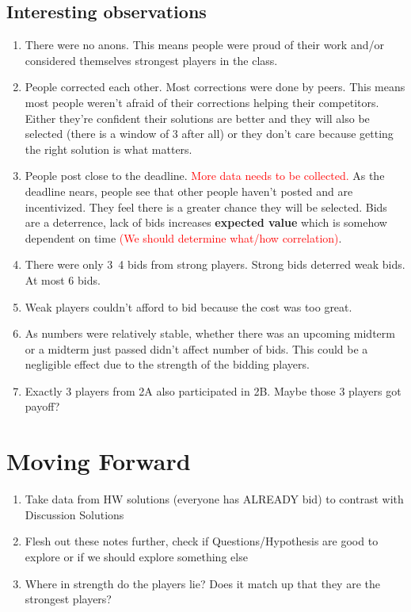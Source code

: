 \documentclass[leqno]{article}
\begin{document}
\subsection{Interesting observations}
\begin{enumerate}
\item There were no anons. This means people were proud of their work and/or considered themselves strongest players in the class.
\item People corrected each other. Most corrections were done by peers. This means most people weren't afraid of their corrections helping their competitors. Either they're confident their solutions are better and they will also be selected (there is a window of 3 after all) or they don't care because getting the right solution is what matters. 
\item People post close to the deadline. \textcolor{red}{More data needs to be collected.} As the deadline nears, people see that other people haven't posted and are incentivized. They feel there is a greater chance they will be selected. Bids are a deterrence, lack of bids increases \textbf{expected value} which is somehow dependent on time \textcolor{red}{(We should determine what/how correlation)}.
\item There were only 3~4 bids from strong players. Strong bids deterred weak bids. At most 6 bids.
\item Weak players couldn't afford to bid because the cost was too great.
\item As numbers were relatively stable, whether there was an upcoming midterm or a midterm just passed didn't affect number of bids. This could be a negligible effect due to the strength of the bidding players.
\item Exactly 3 players from 2A also participated in 2B. Maybe those 3 players got payoff?
\end{enumerate}

\section{Moving Forward}
\begin{enumerate}
\item Take data from HW solutions (everyone has ALREADY bid) to contrast with Discussion Solutions
\item Flesh out these notes further, check if Questions/Hypothesis are good to explore or if we should explore something else
\item Where in strength do the players lie? Does it match up that they are the strongest players?
\end{enumerate}
\end{document}
